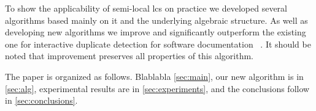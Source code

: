 To show the applicability of semi-local lcs on practice we developed several algorithms based mainly on it and the underlying algebraic structure.
As well as developing new algorithms we improve and significantly outperform the existing one for interactive duplicate detection for software documentation ~\cite{}.
It should be noted that improvement preserves all properties of this algorithm.



The paper is organized as follows.
Blablabla
\cref{sec:main}, our new algorithm is in \cref{sec:alg}, experimental
results are in \cref{sec:experiments}, and the conclusions follow in
\cref{sec:conclusions}.

